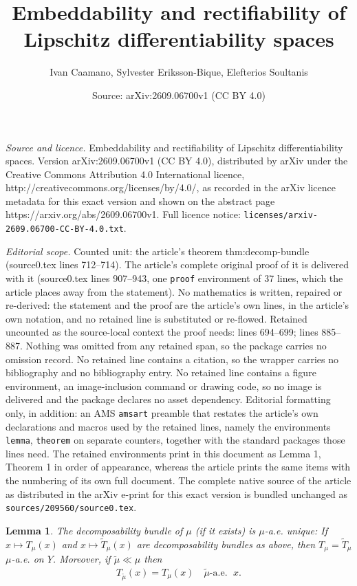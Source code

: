 \documentclass[10pt,a4paper]{amsart}
\title{Embeddability and rectifiability of Lipschitz differentiability spaces}
\author{Ivan Caamano, Sylvester Eriksson-Bique, Elefterios Soultanis}
\date{Source: arXiv:2609.06700v1 (CC BY 4.0)}
\newtheorem{lemma}{Lemma}
\begin{document}
\maketitle

\noindent\emph{Source and licence.} Embeddability and rectifiability of Lipschitz differentiability spaces. Version arXiv:2609.06700v1 (CC BY 4.0), distributed by arXiv under the Creative Commons Attribution 4.0 International licence, http://creativecommons.org/licenses/by/4.0/, as recorded in the arXiv licence metadata for this exact version and shown on the abstract page https://arxiv.org/abs/2609.06700v1. Full licence notice: \texttt{licenses/arxiv-2609.06700-CC-BY-4.0.txt}.\par\smallskip

\noindent\textit{Editorial scope.} Counted unit: the article's theorem thm:decomp-bundle (source0.tex lines 712--714). The article's complete original proof of it is delivered with it (source0.tex lines 907--943, one \texttt{proof} environment of 37 lines, which the article places away from the statement). No mathematics is written, repaired or re-derived: the statement and the proof are the article's own lines, in the article's own notation, and no retained line is substituted or re-flowed.  Retained uncounted as the source-local context the proof needs: lines 694--699; lines 885--887.  Nothing was omitted from any retained span, so the package carries no omission record.  No retained line contains a citation, so the wrapper carries no bibliography and no bibliography entry.  No retained line contains a figure environment, an image-inclusion command or drawing code, so no image is delivered and the package declares no asset dependency.  Editorial formatting only, in addition: an AMS \texttt{amsart} preamble that restates the article's own declarations and macros used by the retained lines, namely the environments \texttt{lemma}, \texttt{theorem} on separate counters, together with the standard packages those lines need.  The retained environments print in this document as Lemma 1, Theorem 1 in order of appearance, whereas the article prints the same items with the numbering of its own full document.  The complete native source of the article as distributed in the arXiv e-print for this exact version is bundled unchanged as \texttt{sources/209560/source0.tex}.
\begin{lemma}\label{lem:basic-prop-of-decomp-bundle}
The decomposability bundle of $\mu$ (if it exists) is $\mu$-a.e. unique: If $x\mapsto T_\mu(x)$ and $x\mapsto \widetilde T_\mu(x)$  are decomposability bundles as above, then $T_\mu=\widetilde T_\mu$ $\mu$-a.e. on $Y$. Moreover, if $\tilde\mu\ll\mu$ then 
\begin{align*}
    T_{\tilde\mu}(x)=T_\mu(x)\quad\tilde\mu\mbox{-a.e. }\; x.
\end{align*}
\end{lemma}
\end{document}
